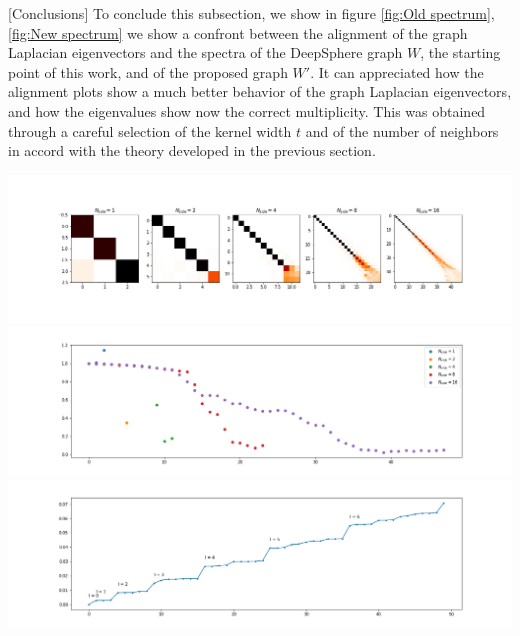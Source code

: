 [Conclusions]
To conclude this subsection, we show in figure \ref{fig:Old spectrum}, \ref{fig:New spectrum} we show a confront between the alignment of the graph Laplacian eigenvectors and the spectra of the DeepSphere graph $W$, the starting point of this work, and  of the proposed graph $W'$. It can appreciated how the alignment plots show a much better behavior of the graph Laplacian eigenvectors, and how the eigenvalues show now the correct multiplicity. This was obtained through a careful selection of the kernel width $t$ and of the number of neighbors in accord with the theory developed in the previous section. \\
\begin{minipage}{.5\textwidth}
	\centering
	\includegraphics[width=0.9\linewidth]{../codes/02.HeatKernelGraphLaplacian/HEALPix/06_figures/deepsphere_original.png}
	\includegraphics[width=0.9\linewidth]{../codes/02.HeatKernelGraphLaplacian/HEALPix/06_figures/deepsphere_original_diagonal.png}
	\includegraphics[width=0.9\linewidth]{../codes/02.HeatKernelGraphLaplacian/HEALPix/05_figs/old_results3.png}
\end{minipage}%
